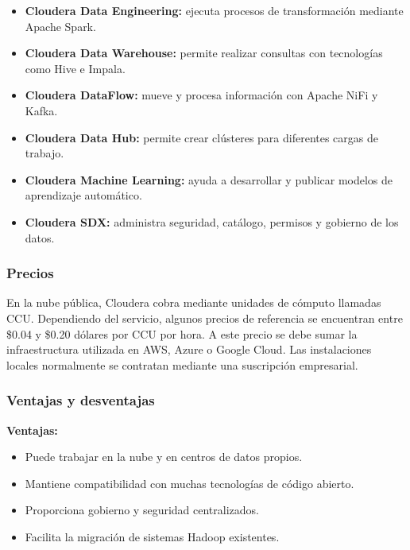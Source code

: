 \begin{itemize}
    \item \textbf{Cloudera Data Engineering:} ejecuta procesos de transformación
    mediante Apache Spark.
    
    \item \textbf{Cloudera Data Warehouse:} permite realizar consultas con
    tecnologías como Hive e Impala.
    
    \item \textbf{Cloudera DataFlow:} mueve y procesa información con Apache
    NiFi y Kafka.
    
    \item \textbf{Cloudera Data Hub:} permite crear clústeres para diferentes
    cargas de trabajo.
    
    \item \textbf{Cloudera Machine Learning:} ayuda a desarrollar y publicar
    modelos de aprendizaje automático.
    
    \item \textbf{Cloudera SDX:} administra seguridad, catálogo, permisos y
    gobierno de los datos.
\end{itemize}

\subsubsection*{Precios}

En la nube pública, Cloudera cobra mediante unidades de cómputo llamadas CCU.
Dependiendo del servicio, algunos precios de referencia se encuentran entre
\$0.04 y \$0.20 dólares por CCU por hora. A este precio se debe sumar la
infraestructura utilizada en AWS, Azure o Google Cloud. Las instalaciones
locales normalmente se contratan mediante una suscripción empresarial.

\subsubsection*{Ventajas y desventajas}

\textbf{Ventajas:}

\begin{itemize}
    \item Puede trabajar en la nube y en centros de datos propios.
    \item Mantiene compatibilidad con muchas tecnologías de código abierto.
    \item Proporciona gobierno y seguridad centralizados.
    \item Facilita la migración de sistemas Hadoop existentes.
\end{itemize}

